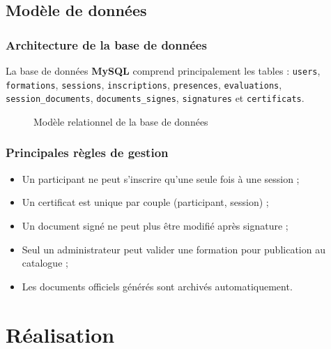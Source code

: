 \documentclass[12pt,a4paper]{report}
\begin{document}
\section{Modèle de données}
\subsection{Architecture de la base de données}
La base de données \textbf{MySQL} comprend principalement les tables :
\texttt{users}, \texttt{formations}, \texttt{sessions},
\texttt{inscriptions}, \texttt{presences}, \texttt{evaluations},
\texttt{session\_documents}, \texttt{documents\_signes},
\texttt{signatures} et \texttt{certificats}.

\begin{figure}[H]
\centering
{}
\caption{Modèle relationnel de la base de données}
\end{figure}

\subsection{Principales règles de gestion}
\begin{itemize}
  \item Un participant ne peut s'inscrire qu'une seule fois à une session ;
  \item Un certificat est unique par couple (participant, session) ;
  \item Un document signé ne peut plus être modifié après signature ;
  \item Seul un administrateur peut valider une formation pour publication
    au catalogue ;
  \item Les documents officiels générés sont archivés automatiquement.
\end{itemize}

\chapter{Réalisation}
\end{document}

